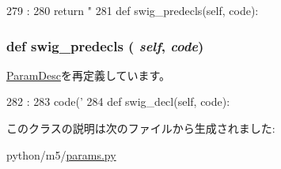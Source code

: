 \begin{DoxyCode}
279                               :
280         return "%
281 
    def swig_predecls(self, code):
\end{DoxyCode}
\hypertarget{classm5_1_1params_1_1VectorParamDesc_ab3dbcf5716623eac67a8ccc074fa7e13}{
\subsubsection[{swig\_\-predecls}]{\setlength{\rightskip}{0pt plus 5cm}def swig\_\-predecls ( {\em self}, \/   {\em code})}}
\label{classm5_1_1params_1_1VectorParamDesc_ab3dbcf5716623eac67a8ccc074fa7e13}


\hyperlink{classm5_1_1params_1_1ParamDesc_ab3dbcf5716623eac67a8ccc074fa7e13}{ParamDesc}を再定義しています。


\begin{DoxyCode}
282                                  :
283         code('%
284 
    def swig_decl(self, code):
\end{DoxyCode}


このクラスの説明は次のファイルから生成されました:\begin{DoxyCompactItemize}
\item 
python/m5/\hyperlink{params_8py}{params.py}\end{DoxyCompactItemize}
